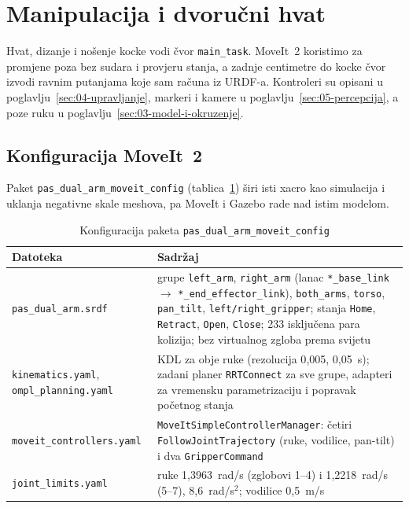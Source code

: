 \section{Manipulacija i dvoručni hvat}
\label{sec:07-manipulacija}

Hvat, dizanje i nošenje kocke vodi čvor \texttt{main\_task}. MoveIt~2 koristimo za promjene poza bez
sudara i provjeru stanja, a zadnje centimetre do kocke čvor izvodi ravnim putanjama koje sam računa iz
URDF-a. Kontroleri su opisani u poglavlju~\ref{sec:04-upravljanje}, markeri i kamere u
poglavlju~\ref{sec:05-percepcija}, a poze ruku u poglavlju~\ref{sec:03-model-i-okruzenje}.

\subsection{Konfiguracija MoveIt~2}
\label{sec:07-moveit}

Paket \texttt{pas\_dual\_arm\_moveit\_config} (tablica~\ref{tab:07-moveit}) širi isti xacro kao
simulacija i uklanja negativne skale meshova, pa MoveIt i Gazebo rade nad istim modelom.

\begin{table}[H]
\centering
\caption{Konfiguracija paketa \texttt{pas\_dual\_arm\_moveit\_config}}
\label{tab:07-moveit}
\footnotesize
\renewcommand{\arraystretch}{1.1}
\begin{tabularx}{\textwidth}{@{}>{\raggedright\arraybackslash}p{}>{\raggedright\arraybackslash}X@{}}
\toprule
\textbf{Datoteka} & \textbf{Sadržaj} \\
\midrule
\texttt{pas\_dual\_arm.srdf} & grupe \texttt{left\_arm}, \texttt{right\_arm} (lanac \texttt{*\_base\_link} $\rightarrow$ \texttt{*\_end\_effector\_link}), \texttt{both\_arms}, \texttt{torso}, \texttt{pan\_tilt}, \texttt{left/right\_gripper}; stanja \texttt{Home}, \texttt{Retract}, \texttt{Open}, \texttt{Close}; 233 isključena para kolizija; bez virtualnog zgloba prema svijetu \\
\texttt{kinematics.yaml}, \texttt{ompl\_planning.yaml} & KDL za obje ruke (rezolucija 0{,}005, 0{,}05~s); zadani planer \texttt{RRTConnect} za sve grupe, adapteri za vremensku parametrizaciju i popravak početnog stanja \\
\texttt{moveit\_controllers.yaml} & \texttt{MoveItSimpleControllerManager}: četiri \texttt{FollowJointTrajectory} (ruke, vodilice, pan-tilt) i dva \texttt{GripperCommand} \\
\texttt{joint\_limits.yaml} & ruke 1{,}3963~rad/s (zglobovi 1--4) i 1{,}2218~rad/s (5--7), 8{,}6~rad/s$^2$; vodilice 0{,}5~m/s \\
\bottomrule
\end{tabularx}
\end{table}


